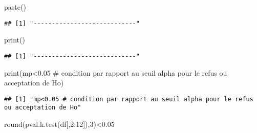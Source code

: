 \documentclass[
]{article}
\newenvironment{Shaded}{\begin{snugshade}}{\end{snugshade}}
\newcommand{\DecValTok}[1]{\textcolor[rgb]{0.00,0.00,0.81}{#1}}
\newcommand{\FloatTok}[1]{\textcolor[rgb]{0.00,0.00,0.81}{#1}}
\newcommand{\FunctionTok}[1]{\textcolor[rgb]{0.00,0.00,0.00}{#1}}
\newcommand{\NormalTok}[1]{#1}
\newcommand{\SpecialCharTok}[1]{\textcolor[rgb]{0.00,0.00,0.00}{#1}}
\newcommand{\StringTok}[1]{\textcolor[rgb]{0.31,0.60,0.02}{#1}}
\begin{document}
\begin{Shaded}
\begin{Highlighting}[]
\FunctionTok{paste}\NormalTok{(}\StringTok{\textquotesingle{}{-}{-}{-}{-}{-}{-}{-}{-}{-}{-}{-}{-}{-}{-}{-}{-}{-}{-}{-}{-}{-}{-}{-}{-}{-}{-}{-}{-}\textquotesingle{}}\NormalTok{)}
\end{Highlighting}
\end{Shaded}

\begin{verbatim}
## [1] "----------------------------"
\end{verbatim}

\begin{Shaded}
\begin{Highlighting}[]
\FunctionTok{print}\NormalTok{(}\StringTok{\textquotesingle{}{-}{-}{-}{-}{-}{-}{-}{-}{-}{-}{-}{-}{-}{-}{-}{-}{-}{-}{-}{-}{-}{-}{-}{-}{-}{-}{-}{-}\textquotesingle{}}\NormalTok{)}
\end{Highlighting}
\end{Shaded}

\begin{verbatim}
## [1] "----------------------------"
\end{verbatim}

\begin{Shaded}
\begin{Highlighting}[]
\FunctionTok{print}\NormalTok{(}\StringTok{\textquotesingle{}mp\textless{}0.05 \# condition par rapport au seuil alpha pour le refus ou acceptation de Ho\textquotesingle{}}\NormalTok{)}
\end{Highlighting}
\end{Shaded}

\begin{verbatim}
## [1] "mp<0.05 # condition par rapport au seuil alpha pour le refus ou acceptation de Ho"
\end{verbatim}

\begin{Shaded}
\begin{Highlighting}[]
\FunctionTok{round}\NormalTok{(}\FunctionTok{pval.k.test}\NormalTok{(df[,}\DecValTok{2}\SpecialCharTok{:}\DecValTok{12}\NormalTok{]),}\DecValTok{3}\NormalTok{)}\SpecialCharTok{\textless{}}\FloatTok{0.05}
\end{Highlighting}
\end{Shaded}
\end{document}
